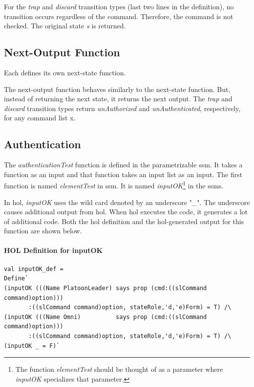 \documentclass[../../main/main.tex]{subfiles}
\begin{document}
For the \textit{trap} and \textit{discard} transition types (last two lines in the definition), no transition occurs regardless of the command.  Therefore, the command is not checked.  The original state \textit{s} is returned.



\subsection{Next-Output Function}
Each  defines its own next-state function. 

\HOLssmPBIntegratedTheoremsPBOutXXdef

The next-output function behaves similarly to the next-state function.  But, instead of returning the next state, it returns the next output.  The \textit{trap} and \textit{discard} transition types return \textit{unAuthorized} and \textit{unAuthenticated}, respectively, for any command list x.

\subsection{Authentication}
The \textit{authenticationTest} function is defined in the parametrizable ssm.  It takes a function as an input and that function takes an input list as an input.  The first function is named \textit{elementTest} in ssm.  It is named \textit{inputOK}\footnote{The function \textit{elementTest} should be thought of as a parameter where \textit{inputOK} specializes that parameter.} in the \glspl{ssm}.

In \gls{hol}, \textit{inputOK} uses the wild card denoted by an underscore "_".  The underscore causes additional output from \gls{hol}.  When \gls{hol} executes the code, it generates a lot of additional code.  Both the \gls{hol} definition and the \gls{hol}-generated output for this function are shown below. 


\paragraph*{HOL Definition for inputOK}


\begin{lstlisting}
val inputOK_def =
Define`
(inputOK (((Name PlatoonLeader) says prop (cmd:((slCommand command)option)))
	   :((slCommand command)option, stateRole,'d,'e)Form) = T) /\
(inputOK (((Name Omni)          says prop (cmd:((slCommand command)option)))
	   :((slCommand command)option, stateRole,'d,'e)Form) = T) /\
(inputOK _ = F)`
\end{lstlisting}
\end{document}
